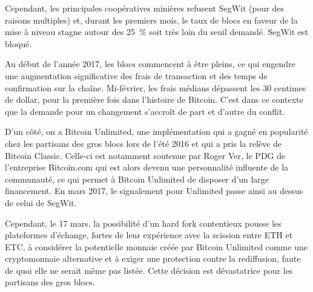Cependant, les principales coopératives minières refusent SegWit (pour des raisons multiples) et, durant les premiers mois, le taux de blocs en faveur de la mise à niveau stagne autour des 25~\% soit très loin du seuil demandé. SegWit est bloqué.

Au début de l'année 2017, les blocs commencent à être pleins, ce qui engendre une augmentation significative des frais de transaction et des temps de confirmation sur la chaîne. Mi-février, les frais médians dépassent les 30 centimes de dollar, pour la première fois dans l'histoire de Bitcoin. C'est dans ce contexte que la demande pour un changement s'accroît de part et d'autre du conflit.

D'un côté, on a Bitcoin Unlimited, une implémentation qui a gagné en popularité chez les partisans des gros blocs lors de l'été 2016 et qui a pris la relève de Bitcoin Classic. Celle-ci est notamment soutenue par Roger Ver, le PDG de l'entreprise Bitcoin.com qui est alors devenu une personnalité influente de la communauté, ce qui permet à Bitcoin Unlimited de disposer d'un large financement. En mars 2017, le signalement pour Unlimited passe ainsi au dessus de celui de SegWit.

Cependant, le 17 mars, la possibilité d'un hard fork contentieux pousse les plateformes d'échange, fortes de leur expérience avec la scission entre ETH et ETC, à considérer la potentielle monnaie créée par Bitcoin Unlimited comme une cryptomonnaie alternative et à exiger une protection contre la rediffusion, faute de quoi elle ne serait même pas listée. Cette décision est dévastatrice pour les partisans des gros blocs.


